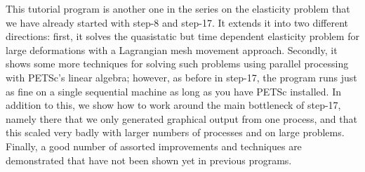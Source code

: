 \documentclass{article}
\begin{document}
This tutorial program is another one in the series on the elasticity problem
that we have already started with step-8 and step-17. It extends it into two
different directions: first, it solves the quasistatic but time dependent
elasticity problem for large deformations with a Lagrangian mesh movement
approach. Secondly, it shows some more techniques for solving such problems
using parallel processing with PETSc's linear algebra; however, as before in
step-17, the program runs just as fine on a single sequential machine as long
as you have PETSc installed. In addition to this, we show how to work around
the main bottleneck of step-17, namely there that we only generated graphical
output from one process, and that this scaled very badly with larger numbers
of processes and on large problems. Finally, a good number of assorted
improvements and techniques are demonstrated that have not been shown yet in
previous programs.
\end{document}
